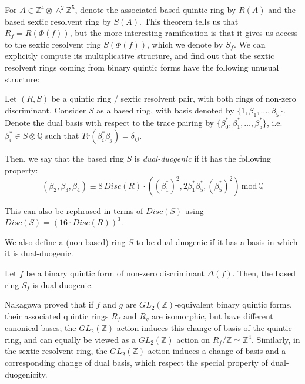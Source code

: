 \documentclass{article}
\begin{document}
For $A \in \mathbb{Z}^4 \otimes \wedge^2 \mathbb{Z}^5$, denote the associated based quintic ring by $R(A)$ and the based sextic resolvent ring by $S(A)$.  This theorem tells us that $R_f = R(\Phi(f))$, but the more interesting ramification is that it gives us access to the sextic resolvent ring $S(\Phi(f))$, which we denote by $S_f$.  We can explicitly compute its multiplicative structure, and find out that the sextic resolvent rings coming from binary quintic forms have the following unusual structure:

\begin{definition} \label{dual duogenic}
Let $(R,S)$ be a quintic ring / sextic resolvent pair, with both rings of non-zero discriminant.  Consider $S$ as a based ring, with basis denoted by $\{1,\beta_1,\ldots,\beta_5\}$.  Denote the dual basis with respect to the trace pairing by $\{\beta_0^*,\beta_1^*,\ldots,\beta_5^*\}$, i.e. $\beta_i^* \in S \otimes \mathbb{Q}$ such that $Tr(\beta_i^* \beta_j) = \delta_{ij}$.

Then, we say that the based ring $S$ is \emph{dual-duogenic} if it has the following property:
\begin{equation}
(\beta_2,\beta_3,\beta_4) \equiv 8 \, Disc(R) \cdot ( (\beta_1^*)^2, 2 \beta_1^* \beta_5^*, (\beta_5^*)^2 ) \, \text{mod} \, \mathbb{Q}
\end{equation}

This can also be rephrased in terms of $Disc(S)$ using $Disc(S) = (16 \cdot Disc(R))^3$.

We also define a (non-based) ring $S$ to be dual-duogenic if it has a basis in which it is dual-duogenic.
\end{definition}

\begin{theorem} \label{sextic structure}
Let $f$ be a binary quintic form of non-zero discriminant $\Delta(f)$.  Then, the based ring $S_f$ is dual-duogenic.
\end{theorem}

Nakagawa proved that if $f$ and $g$ are $GL_2(\mathbb{Z})$-equivalent binary quintic forms, their associated quintic rings $R_f$ and $R_g$ are isomorphic, but have different canonical bases; the $GL_2(\mathbb{Z})$ action induces this change of basis of the quintic ring, and can equally be viewed as a $GL_2(\mathbb{Z})$ action on $R_f / \mathbb{Z} \simeq \mathbb{Z}^4$.  Similarly, in the sextic resolvent ring, the $GL_2(\mathbb{Z})$ action induces a change of basis and a corresponding change of dual basis, which respect the special property of dual-duogenicity.
\end{document}
